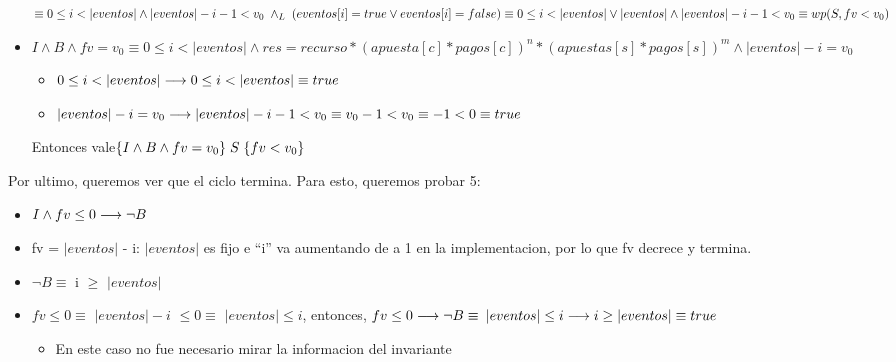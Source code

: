 \documentclass[10pt,a4paper]{article}
\begin{document}
\begin{proof*}
\begin{minipage}[t]{18cm}
\begin{itemize}
{        $
        \equiv 0 \leq i < |eventos| \land |eventos| -i-1 < v_0 \hspace{0.1cm} \land _L \hspace{0.1cm} (eventos[i] = true \lor eventos[i] = false) \\
        \equiv 0 \leq i < |eventos| \lor |eventos| \land |eventos| -i-1 < v_0 \equiv wp(S, fv < v_0)$}
        \item {$I \land B \land fv = v_0 \equiv 0 \leq i < |eventos| \land res = recurso * (apuesta[c]*pagos[c])^{n} * (apuestas[s]* pagos[s])^{m} \land |eventos| - i = v_0$}
        \begin{itemize}
              \item {$0 \leq i < |eventos| \longrightarrow 0 \leq i < |eventos| \equiv true$}
              \item {$|eventos| - i = v_0 \longrightarrow |eventos| -i-1 < v_0 \equiv v_0 - 1 < v_0 \equiv -1 < 0 \equiv true$}
        \end{itemize}
        \vspace{0.5cm}
        Entonces vale$ \{I \land B \land fv = v_0\} \hspace{0.1cm} S \hspace{0.1cm} \{fv < v_0\}$
    \end{itemize}
    \end{minipage}
    
\vspace{1cm}

Por ultimo, queremos ver que el ciclo termina. Para esto, queremos probar 5:
    \begin{itemize}
        \item $I \land fv \leq 0 \longrightarrow \neg B$
    \end{itemize}

\begin{itemize}
    \vspace{0.2cm}
    \item fv = ${|eventos|}$ - i: ${|eventos|}$ es fijo e ``i'' va aumentando de a 1 en la implementacion, por lo que fv decrece y termina.
    \item $\neg  B \equiv$ \hspace{0.2cm} i \hspace{0.2cm} $\geq$
    \hspace{0.2cm}
    ${|eventos|}$
    \item {$fv \leq 0 \equiv$ \hspace{0.1cm} ${|eventos|} - i$ $\leq 0 \equiv$ \hspace{0.1cm} ${|eventos|} \leq i$}, \hspace{0.2cm} entonces,
    \vspace{0.2cm} $fv \leq 0 \longrightarrow \neg B \equiv$ \vspace{0.2cm} ${|eventos|} \leq i \longrightarrow i \geq {|eventos|} \equiv true$
    \begin{itemize}
              \item En este caso no fue necesario mirar la informacion del invariante \\
              

\end{itemize}
\end{itemize}
\end{proof*}
\end{document}
